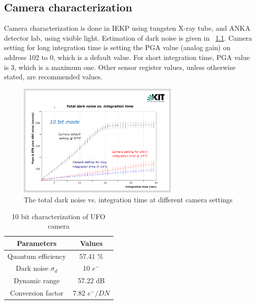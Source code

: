 %

\begin{appendix}

\chapter{Camera characterization}
\label{camera_char}

Camera characterization is done in IEKP using tungsten X-ray tube, and ANKA detector lab, using visible light.
Estimation of dark noise is given in \figurename~\ref{darknoise}. Camera setting for long integration time is setting the PGA value (analog gain) on address 102 to 0, which is a default value. For short integration time, PGA value is 3, which is a maximum one. Other sensor register values, unless otherwise stated, are recommended values.

\begin{figure}[ht]
\centering
\includegraphics[width=0.70\textwidth]{images/camera_char1.png}
\caption{\label{darknoise}The total dark noise vs. integration time at different camera settings}
\end{figure}
\begin{table}[h]
\begin{center}
{\begin{tabular}{|c|c|}
\hline
Parameters & Values \\ 
\hline
Quantum efficiency &  57.41 \% \\
\hline
Dark noise  $\sigma_{d}$ &  10 $e^{-}$\\
\hline
Dynamic range & 57.22 dB \\
\hline
Conversion factor	& 7.82 $e^{-}/{DN}$ \\
\hline
\end{tabular}}
\caption{10 bit characterization of UFO camera}
\label{char_10b}
\end{center}
\end{table}



\end{appendix}

